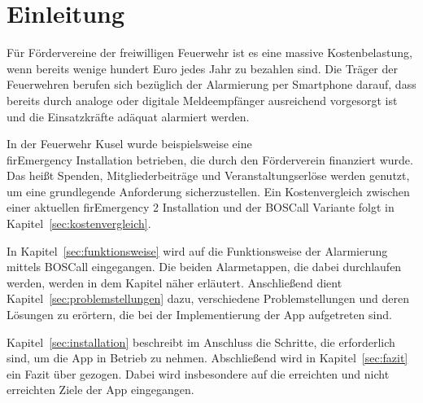 \section{Einleitung}
Für Fördervereine der freiwilligen Feuerwehr ist es eine massive Kostenbelastung, wenn bereits wenige hundert Euro jedes Jahr zu bezahlen sind. Die Träger der Feuerwehren berufen sich bezüglich der Alarmierung per Smartphone darauf, dass bereits durch analoge oder digitale Meldeempfänger ausreichend vorgesorgt ist und die Einsatzkräfte adäquat alarmiert werden.

In der Feuerwehr Kusel wurde beispielsweise eine\\ firEmergency\cite{Alamos:FE2} Installation betrieben, die durch den Förderverein finanziert wurde. Das heißt Spenden, Mitgliederbeiträge und Veranstaltungserlöse werden genutzt, um eine grundlegende Anforderung sicherzustellen. Ein Kostenvergleich zwischen einer aktuellen {firEmergency 2} Installation und der BOSCall Variante folgt in Kapitel~\ref{sec:kostenvergleich}.

In Kapitel~\ref{sec:funktionsweise} wird auf die Funktionsweise der Alarmierung mittels BOSCall eingegangen. Die beiden Alarmetappen, die dabei durchlaufen werden, werden in dem Kapitel näher erläutert. Anschließend dient Kapitel~\ref{sec:problemstellungen} dazu, verschiedene Problemstellungen und deren Lösungen zu erörtern, die bei der Implementierung der App aufgetreten sind.

Kapitel~\ref{sec:installation} beschreibt im Anschluss die Schritte, die erforderlich sind, um die App in Betrieb zu nehmen. Abschließend wird in Kapitel~\ref{sec:fazit} ein Fazit über gezogen. Dabei wird insbesondere auf die erreichten und nicht erreichten Ziele der App eingegangen.